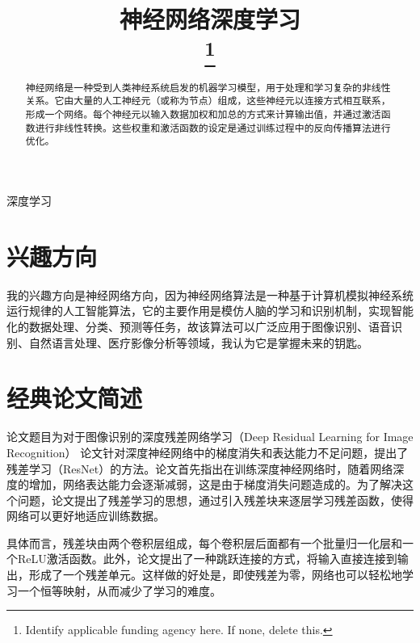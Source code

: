 \documentclass[conference]{IEEEtran}
\begin{document}
\title{神经网络深度学习\\
{\footnotesize \textsuperscript{}}
\thanks{Identify applicable funding agency here. If none, delete this.}
}

\author{

}

\maketitle

\begin{abstract}
神经网络是一种受到人类神经系统启发的机器学习模型，用于处理和学习复杂的非线性关系。它由大量的人工神经元（或称为节点）组成，这些神经元以连接方式相互联系，形成一个网络。每个神经元以输入数据加权和加总的方式来计算输出值，并通过激活函数进行非线性转换。这些权重和激活函数的设定是通过训练过程中的反向传播算法进行优化。
\end{abstract}

\begin{IEEEkeywords}
深度学习
\end{IEEEkeywords}

\section{兴趣方向}
 
我的兴趣方向是神经网络方向，因为神经网络算法是一种基于计算机模拟神经系统运行规律的人工智能算法，它的主要作用是模仿人脑的学习和识别机制，实现智能化的数据处理、分类、预测等任务，故该算法可以广泛应用于图像识别、语音识别、自然语言处理、医疗影像分析等领域，我认为它是掌握未来的钥匙。
\section{经典论文简述}

论文题目为对于图像识别的深度残差网络学习（Deep Residual Learning for Image Recognition）
论文针对深度神经网络中的梯度消失和表达能力不足问题，提出了残差学习（ResNet）的方法。论文首先指出在训练深度神经网络时，随着网络深度的增加，网络表达能力会逐渐减弱，这是由于梯度消失问题造成的。为了解决这个问题，论文提出了残差学习的思想，通过引入残差块来逐层学习残差函数，使得网络可以更好地适应训练数据。

具体而言，残差块由两个卷积层组成，每个卷积层后面都有一个批量归一化层和一个ReLU激活函数。此外，论文提出了一种跳跃连接的方式，将输入直接连接到输出，形成了一个残差单元。这样做的好处是，即使残差为零，网络也可以轻松地学习一个恒等映射，从而减少了学习的难度。
\end{document}
